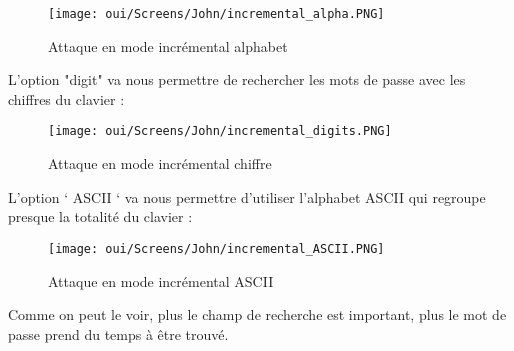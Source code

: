 \begin{figure}[htp!]
  \centering
  \setlength\figureheight{7cm}
  \setlength\figurewidth{9cm}
  \texttt{[image: oui/Screens/John/incremental\_alpha.PNG]}
  \caption{Attaque en mode incrémental alphabet}
  \label{fig:courbe-tikz}
\end{figure}

L’option "digit" va nous permettre de rechercher les mots de passe avec les chiffres du clavier :

\begin{figure}[htp!]
  \centering
  \setlength\figureheight{7cm}
  \setlength\figurewidth{9cm}
  \texttt{[image: oui/Screens/John/incremental\_digits.PNG]}
  \caption{Attaque en mode incrémental chiffre}
  \label{fig:courbe-tikz}
\end{figure}

L’option ‘ ASCII ‘ va nous permettre d’utiliser l'alphabet ASCII qui regroupe presque la totalité du clavier :

\begin{figure}[htp!]
  \centering
  \setlength\figureheight{7cm}
  \setlength\figurewidth{9cm}
  \texttt{[image: oui/Screens/John/incremental\_ASCII.PNG]}
  \caption{Attaque en mode incrémental ASCII}
  \label{fig:courbe-tikz}
\end{figure}

Comme on peut le voir, plus le champ de recherche est important, plus le mot de passe prend du temps à être trouvé.